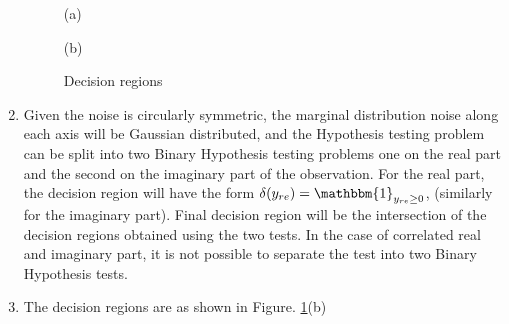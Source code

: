 \documentclass[a4paper,english,10pt]{article}
\begin{document}
\begin{enumerate}[label=(\alph{*}).]
\begin{figure}[h]
\begin{minipage}[b]{0.45\textwidth}
\centerline{(a)}
\end{minipage}
\begin{minipage}[b]{0.45\textwidth}
\centerline{(b)}
\end{minipage}
\caption{Decision regions}
\label{fig:DecReg}
\end{figure}
\item Given the noise is circularly symmetric, the marginal distribution noise along each axis will be Gaussian distributed, and the Hypothesis testing problem can be split into two Binary Hypothesis testing problems one on the real part and the second on the imaginary part of the observation. For the real part, the decision region will have the form $\delta(y_{re})=\mathbbm{1}_{y_{re}\geq 0}$, (similarly for the imaginary part). Final decision region will be the intersection of the decision regions obtained using the two tests. In the case of correlated real and imaginary part, it is not possible to separate the test into two Binary Hypothesis tests.
\item The decision regions are as shown in Figure. \ref{fig:DecReg}(b)
\end{enumerate}
\end{document}
